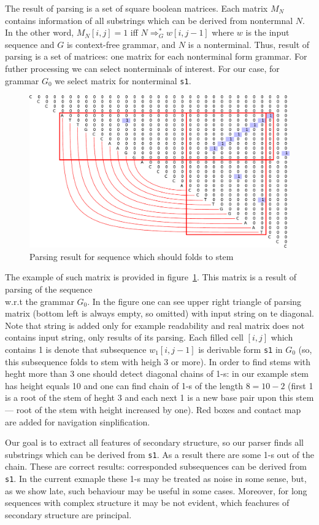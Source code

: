 \documentclass[a4paper,twoside]{article}
\begin{document}
\noindent The result of parsing is a set of square boolean matrices. 
Each matrix $M_N$ contains information of all substrings which can be derived from nontermnal $N$.
In the other word, $M_N[i,j]=1$ iff $N \Rightarrow^*_G w[i,j-1]$ where $w$ is the input sequence and $G$ is context-free grammar, and $N$ is a nonterminal.
Thus, result of parsing is a set of matrices: one matrix for each nonterminal form grammar.
For futher processing we can select nonterminals of interest.
For our case, for grammar $G_0$ we select matrix for nonterminal \verb|s1|.

\begin{figure}
\centering
\includegraphics[width=.45\textwidth]{figures/4.pdf}
\caption{Parsing result for sequence which should folds to stem}
\label{fig:matrix-simple-stem}
\end{figure}

The example of such matrix is provided in figure~\ref{fig:matrix-simple-stem}.
This matrix is a result of parsing of the sequence {  \\} w.r.t the grammar $G_0$.
In the figure one can see upper right triangle of parsing matrix (bottom left is always empty, so omitted) with input string on te diagonal.
Note that string is added only for example readability and real matrix does not contains input string, only results of its parsing.
Each filled cell $[i,j]$ which contains 1 is denote that subsequence $w_1[i,j-1]$ is derivable form \verb|s1| in $G_0$ (so, this subsequence folds to stem with heigh 3 or more).
In order to find stems with heght more than 3 one should detect diagonal chains of 1-s: in our example stem has height equals 10 and one can find chain of 1-s of the length $8=10-2$ (first 1 is a root of the stem of heght 3 and each next 1 is a new base pair upon this stem --- root of the stem with height increased by one).
Red boxes and contact map are added for navigation sinplification.

Our goal is to extract all features of secondary structure, so our parser finds all substrings which can be derived from \verb|s1|.
As a result there are some 1-s out of the chain.
These are correct results: corresponded subsequences can be derived from \verb|s1|. 
In the current exmaple these 1-s may be treated as noise in some sense, but, as we show late, such behaviour may be useful in some cases.
Moreover, for long sequences with complex structure it may be not evident, which feachures of secondary structure are principal.
\end{document}
